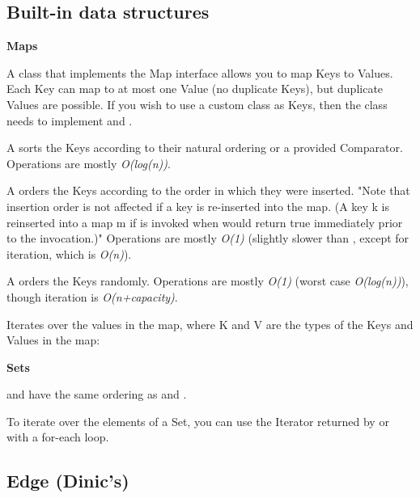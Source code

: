 
\subsection*{Built-in data structures}

\textbf{Maps}

A class that implements the Map interface allows you to map Keys to Values. Each Key can map to at most one Value (no duplicate Keys), but duplicate Values are possible. If you wish to use a custom class as Keys, then the class needs to implement  and .

A  sorts the Keys according to their natural ordering or a provided Comparator. Operations are mostly \textit{O(log(n))}.

A  orders the Keys according to the order in which they were inserted. "Note that insertion order is not affected if a key is re-inserted into the map. (A key k is reinserted into a map m if  is invoked when  would return true immediately prior to the invocation.)" Operations are mostly \textit{O(1)} (slightly slower than , except for iteration, which is \textit{O(n)}).

A  orders the Keys randomly. Operations are mostly \textit{O(1)} (worst case \textit{O(log(n))}), though iteration is \textit{O(n+capacity)}.

Iterates over the values in the map, where K and V are the types of the Keys and Values in the map:




\textbf{Sets}

 and  have the same ordering as  and .

To iterate over the elements of a Set, you can use the Iterator returned by  or with a for-each loop.

\subsection*{Edge (Dinic's)}



\newpage